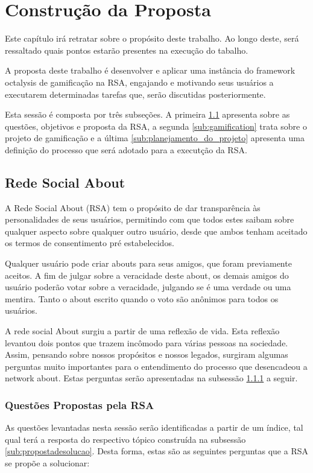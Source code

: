 \chapter[Construção da Proposta]{Construção da Proposta}

Este capítulo irá retratar sobre o propósito deste trabalho. Ao longo deste, será ressaltado quais
pontos estarão presentes na execução do tabalho.

A proposta deste trabalho é desenvolver e aplicar uma instância do framework octalysis de gamificação na RSA, engajando e
motivando seus usuários a executarem determinadas tarefas que, serão discutidas posteriormente.

Esta sessão é composta por três subseções. A primeira \ref{sub:redesocialabout} apresenta sobre
as questões, objetivos e proposta da RSA, a segunda \ref{sub:gamification} trata
sobre o projeto de gamificação e a última \ref{sub:planejamento_do_projeto} apresenta uma definição
do processo que será adotado para a executção da RSA.

\section{Rede Social About}
\label{sub:redesocialabout}
A Rede Social About (RSA) tem o propósito de dar transparência às personalidades de seus usuários, permitindo com que todos
estes saibam sobre qualquer aspecto sobre qualquer outro usuário, desde que ambos tenham aceitado os
termos de consentimento pré estabelecidos.

Qualquer usuário pode criar abouts para seus amigos, que foram previamente aceitos. A fim de julgar
sobre a veracidade deste about, os demais amigos do usuário poderão votar sobre a veracidade,
julgando se é uma verdade ou uma mentira. Tanto o about escrito quando o voto são anônimos para todos os
usuários.

A rede social About surgiu a partir de uma reflexão de vida. Esta reflexão
levantou dois pontos que trazem incômodo para várias pessoas na sociedade.
Assim, pensando sobre
nossos propósitos e nossos legados, surgiram algumas perguntas muito importantes
para o entendimento do processo que desencadeou a network about.
Estas perguntas serão apresentadas na subsessão \ref{sub:questoesrsa} a
seguir.


\subsection{Questões Propostas pela RSA}
\label{sub:questoesrsa}
As questões levantadas nesta sessão serão identificadas a partir de um índice,
tal qual terá a resposta do respectivo tópico
construída na subsessão \ref{sub:propostadesolucao}. Desta forma, estas
são as seguintes perguntas que a RSA se propõe a solucionar:

